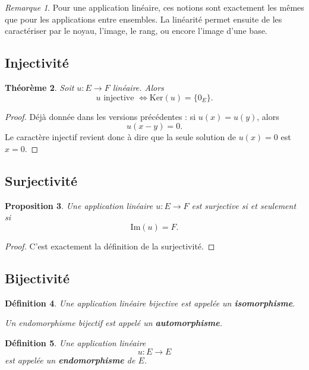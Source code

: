 \documentclass[11pt,a4paper]{article}
\newtheorem{definition}{Définition}[section]
\newtheorem{theoreme}[definition]{Théorème}
\newtheorem{proposition}[definition]{Proposition}
\theoremstyle{remark}
\newtheorem{remarque}[definition]{Remarque}
\newcommand{\Ker}{\mathrm{Ker}}
\newcommand{\Img}{\mathrm{Im}}
\begin{document}
\begin{remarque}
Pour une application linéaire, ces notions sont exactement les mêmes que pour les applications entre ensembles.
La linéarité permet ensuite de les caractériser par le noyau, l’image, le rang, ou encore l’image d’une base.
\end{remarque}

\subsection{Injectivité}

\begin{theoreme}
Soit \(u:E\to F\) linéaire. Alors
\[
u \text{ injective }
\Longleftrightarrow
\Ker(u)=\{0_E\}.
\]
\end{theoreme}

\begin{proof}
Déjà donnée dans les versions précédentes : si \(u(x)=u(y)\), alors
\[
u(x-y)=0.
\]
Le caractère injectif revient donc à dire que la seule solution de \(u(x)=0\) est \(x=0\).
\end{proof}

\subsection{Surjectivité}

\begin{proposition}
Une application linéaire \(u:E\to F\) est surjective si et seulement si
\[
\Img(u)=F.
\]
\end{proposition}

\begin{proof}
C’est exactement la définition de la surjectivité.
\end{proof}

\subsection{Bijectivité}

\begin{definition}
Une application linéaire bijective est appelée un \textbf{isomorphisme}.

Un endomorphisme bijectif est appelé un \textbf{automorphisme}.
\end{definition}

\begin{definition}
Une application linéaire
\[
u:E\to E
\]
est appelée un \textbf{endomorphisme} de \(E\).
\end{definition}
\end{document}
